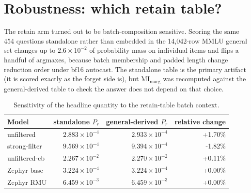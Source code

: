 \documentclass[11pt]{article}
\begin{document}
\section{Robustness: which retain table?}
The retain arm turned out to be batch-composition sensitive. Scoring the same 454
questions standalone rather than embedded in the 14{,}042-row MMLU general set changes up to
$2.6\times10^{-2}$ of probability mass on individual items and flips a handful of argmaxes,
because batch membership and padded length change reduction order under bf16 autocast. The
standalone table is the primary artifact (it is scored exactly as the forget side is), but
$\mathrm{MI}_{\mathrm{marg}}$ was recomputed against the general-derived table to check the
answer does not depend on that choice.
\begin{table}[h]\centering\small
\begin{tabular}{lrrr}
\toprule
Model & standalone $P_r$ & general-derived $P_r$ & relative change\\
\midrule
unfiltered & $2.883\times10^{-4}$ & $2.933\times10^{-4}$ & +1.70\%\\
strong-filter & $9.569\times10^{-4}$ & $9.394\times10^{-4}$ & -1.82\%\\
unfiltered-cb & $2.267\times10^{-2}$ & $2.270\times10^{-2}$ & +0.11\%\\
Zephyr base & $3.224\times10^{-4}$ & $3.224\times10^{-4}$ & +0.00\%\\
Zephyr RMU & $6.459\times10^{-3}$ & $6.459\times10^{-3}$ & +0.00\%\\
\bottomrule\end{tabular}
\caption{Sensitivity of the headline quantity to the retain-table batch context.}\label{tab:retainvariant}
\end{table}
\end{document}
